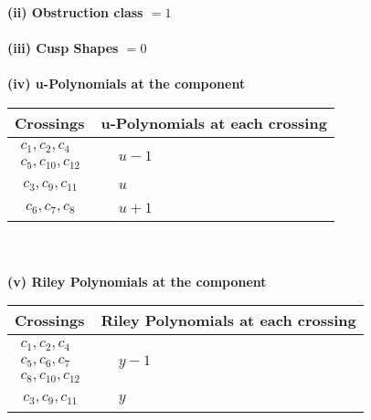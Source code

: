 \documentclass[1p]{elsarticle_modified}
\theoremstyle{definition}
\begin{document}
\flushleft \textbf{(ii) Obstruction class $= 1$}\\~\\
\flushleft \textbf{(iii) Cusp Shapes $= 0$}\\~\\
\newpage\renewcommand{\arraystretch}{1}
\flushleft \textbf{(iv) u-Polynomials at the component}\newline \\
\begin{tabular}{m{50pt}|m{274pt}}
Crossings & \hspace{64pt}u-Polynomials at each crossing \\
\hline $$\begin{aligned}c_{1},c_{2},c_{4}\\c_{5},c_{10},c_{12}\end{aligned}$$&$\begin{aligned}
&u-1
\end{aligned}$\\
\hline $$\begin{aligned}c_{3},c_{9},c_{11}\end{aligned}$$&$\begin{aligned}
&u
\end{aligned}$\\
\hline $$\begin{aligned}c_{6},c_{7},c_{8}\end{aligned}$$&$\begin{aligned}
&u+1
\end{aligned}$\\
\hline
\end{tabular}\\~\\
\newpage\renewcommand{\arraystretch}{1}
\flushleft \textbf{(v) Riley Polynomials at the component}\newline \\
\begin{tabular}{m{50pt}|m{274pt}}
Crossings & \hspace{64pt}Riley Polynomials at each crossing \\
\hline $$\begin{aligned}c_{1},c_{2},c_{4}\\c_{5},c_{6},c_{7}\\c_{8},c_{10},c_{12}\end{aligned}$$&$\begin{aligned}
&y-1
\end{aligned}$\\
\hline $$\begin{aligned}c_{3},c_{9},c_{11}\end{aligned}$$&$\begin{aligned}
&y
\end{aligned}$\\
\hline
\end{tabular}\\~\\
\end{document}
